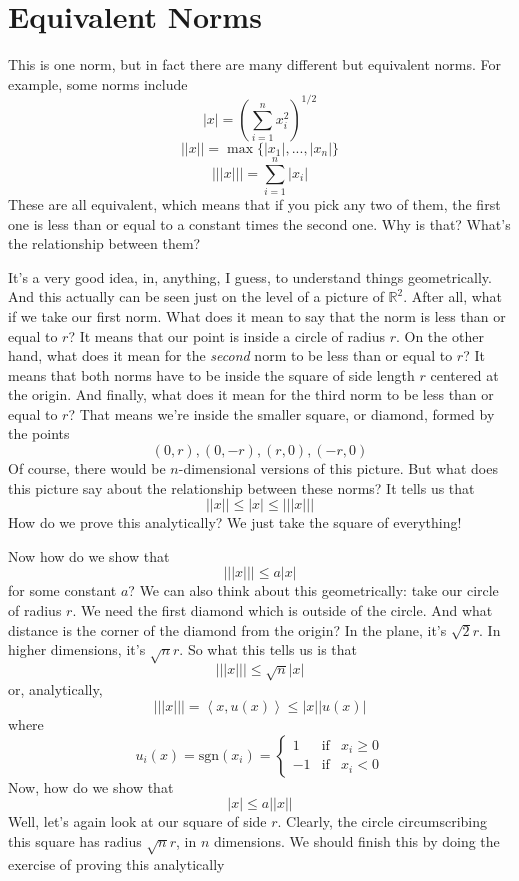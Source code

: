 \documentclass{article}
\newcommand{\reals}[0]{\mathbb{R}}
\newcommand{\ip}[2]{\left\langle#1,#2\right\rangle}
\begin{document}
\section*{Equivalent Norms}
This is one norm, but in fact there are many different but equivalent norms. For example, some norms include
\[|x| = \left(\sum_{i = 1}^nx_i^2\right)^{1/2}\]
\[||x|| = \max\{|x_1|,...,|x_n|\}\]
\[|||x||| = \sum_{i = 1}^n|x_i|\]
These are all equivalent, which means that if you pick any two of them, the first one is less than or equal to a constant times the second one. Why is that? What's the relationship between them?

It's a very good idea, in, anything, I guess, to understand things geometrically. And this actually can be seen just on the level of a picture of \(\reals^2\). After all, what if we take our first norm. What does it mean to say that the norm is less than or equal to \(r\)? It means that our point is inside a circle of radius \(r\). On the other hand, what does it mean for the \textit{second} norm to be less than or equal to \(r\)? It means that both norms have to be inside the square of side length \(r\) centered at the origin. And finally, what does it mean for the third norm to be less than or equal to \(r\)? That means we're inside the smaller square, or diamond, formed by the points
\[(0, r), (0, -r), (r, 0), (-r, 0)\]
Of course, there would be \(n\)-dimensional versions of this picture. But what does this picture say about the relationship between these norms? It tells us that
\[||x|| \leq |x| \leq |||x|||\]
How do we prove this analytically? We just take the square of everything!

Now how do we show that
\[|||x||| \leq a|x|\]
for some constant \(a\)? We can also think about this geometrically: take our circle of radius \(r\). We need the first diamond which is outside of the circle. And what distance is the corner of the diamond from the origin? In the plane, it's \(\sqrt{2}r\). In higher dimensions, it's \(\sqrt{n}r\). So what this tells us is that
\[|||x||| \leq \sqrt{n}|x|\]
or, analytically,
\[|||x||| = \ip{x}{u(x)} \leq |x||u(x)|\]
where
\[u_i(x) = \text{sgn}(x_i) = \left\{\begin{array}{ccc} 1 & \text{if} & x_i \geq 0 \\ -1 & \text{if} & x_i < 0 \end{array}\right.\]
Now, how do we show that
\[|x| \leq a||x||\]
Well, let's again look at our square of side \(r\). Clearly, the circle circumscribing this square has radius \(\sqrt{n}r\), in \(n\) dimensions. We should finish this by doing the exercise of proving this analytically
\end{document}
